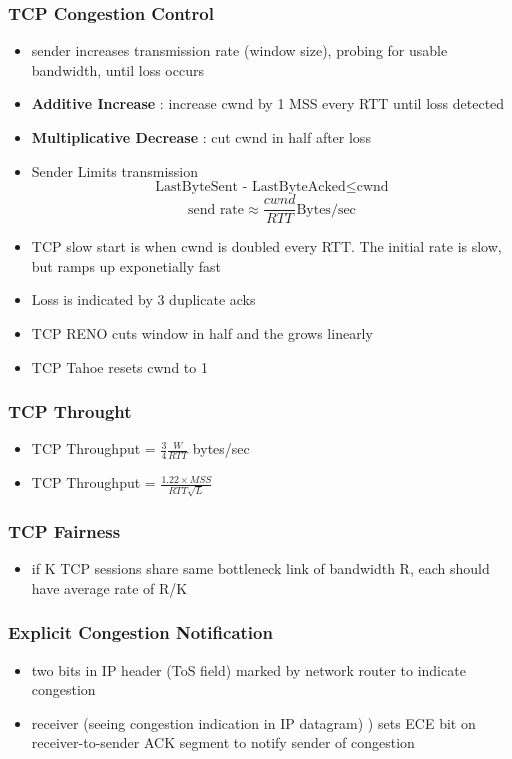 \documentclass[twoside]{article}
\begin{document}
\subsubsection{TCP Congestion Control}
\begin{itemize}
\item sender increases transmission rate (window size), probing for usable bandwidth, until loss occurs
\item \textbf{Additive Increase} : increase cwnd by 1 MSS every RTT until loss detected
\item \textbf{Multiplicative Decrease} : cut cwnd in half after loss
\item Sender Limits transmission 
$$ \text{LastByteSent - LastByteAcked} \leq \text{cwnd}$$
$$ \text{send rate} \approx \frac{cwnd}{RTT} \text{Bytes/sec} $$
\item TCP slow start is when cwnd is doubled every RTT. The initial rate is slow, but ramps up exponetially fast
\item Loss is indicated by 3 duplicate acks 
\item TCP RENO cuts window in half and the grows linearly
\item TCP Tahoe resets cwnd to 1
\end{itemize}

\subsubsection{TCP Throught}
\begin{itemize}
\item TCP Throughput = \( \frac{3}{4} \frac{W}{RTT} \) bytes/sec
\item TCP Throughput = \(\frac{1.22 \times MSS}{RTT \sqrt{L}}\)
\end{itemize}

\subsubsection{TCP Fairness}
\begin{itemize}
\item if K TCP sessions share same bottleneck link of bandwidth R, each should have average rate of R/K
\end{itemize}

\subsubsection{Explicit Congestion Notification}
\begin{itemize}
\item two bits in IP header (ToS field) marked by network router to indicate congestion
\item receiver (seeing congestion indication in IP datagram) ) sets ECE bit on receiver-to-sender ACK segment to notify sender of congestion
\end{itemize}
\end{document}
